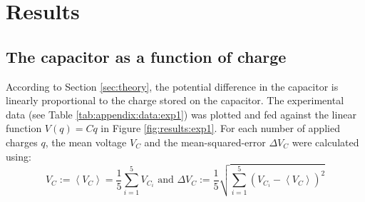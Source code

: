 \section{Results} \label{sec:results}

\subsection{The capacitor as a function of charge} \label{sec:results:exp1}

According to Section \ref{sec:theory}, the potential difference in the capacitor is linearly proportional to the charge stored on the capacitor. The experimental data (see Table \ref{tab:appendix:data:exp1}) was plotted and fed against the linear function $V(q) = Cq$ in Figure \ref{fig:results:exp1}. For each number of applied charges $q$, the mean voltage $V_C$ and the mean-squared-error $\Delta V_C$ were calculated using:
\begin{equation*}
    V_C := \left< V_C \right> = \frac{1}{5}\sum_{i=1}^{5} V_{C_i} \text{  and  } \Delta V_C := \frac{1}{5}\sqrt{ \sum_{i=1}^{5} (V_{C_i} - \left< V_C \right>)^2 }
\end{equation*}

